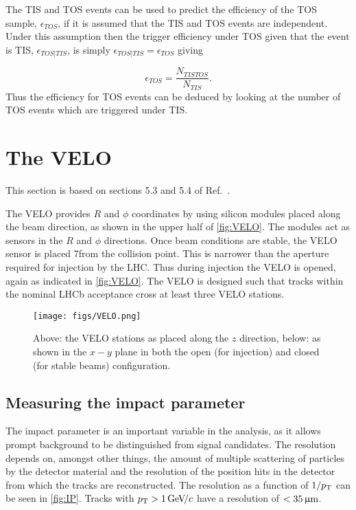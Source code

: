 The TIS and TOS events can be used to predict the efficiency of the TOS sample, $\epsilon_{TOS}$, if it is assumed that the TIS and TOS events are independent. Under this assumption then the trigger efficiency under TOS given that the event is TIS, $\epsilon_{TOS|TIS}$, is simply $\epsilon_{TOS|TIS} = \epsilon_{TOS} $ giving

\begin{equation}
  \epsilon_{TOS} = \frac{N_{TISTOS}}{N_{TIS}}.
\end{equation}
Thus the efficiency for TOS events can be deduced by looking at the number of TOS events which are triggered under TIS.


\FloatBarrier

\section{The VELO}
\label{sec:velo}
This section is based on sections 5.3 and 5.4 of Ref.~\cite{LHCb-DP-2014-001}.

The VELO provides $R$ and $\phi$ coordinates by using silicon modules placed along the beam direction, as shown in the upper half of \autoref{fig:VELO}. The modules act as sensors in the $R$ and $\phi$ directions. Once beam conditions are stable, the VELO sensor is placed 7\mm from the collision point. This is narrower than the aperture required for injection by the LHC. Thus during injection the VELO is opened, again as indicated in \autoref{fig:VELO}. The VELO is designed such that tracks within the nominal LHCb acceptance cross at least three VELO stations.
\begin{figure}[!h]
  \centering
    \texttt{[image: figs/VELO.png]} 
  \caption{Above: the VELO stations as placed along the $z$ direction, below: as shown in the $x-y$ plane in both the open (for injection) and closed (for stable beams) configuration\cite{det_paper}. %
  }
  \label{fig:VELO}
\end{figure}

\subsection{Measuring the impact parameter}
The impact parameter is an important variable in the \Lbpi analysis, as it allows \gls{prompt} background to be distinguished from signal candidates. The resolution depends on, amongst other things, the amount of multiple scattering of particles by the detector material and the resolution of the position hits in the detector from which the tracks are reconstructed. The resolution as a function of $1/\mbox{$p_{\rm T}$}$ can be seen in \autoref{fig:IP}. Tracks with $\mbox{$p_{\rm T}$}>1{\mathrm{\,Ge\kern -0.1em V\!/}c}$ have a resolution of $<35{\,\upmu\rm m}$.


